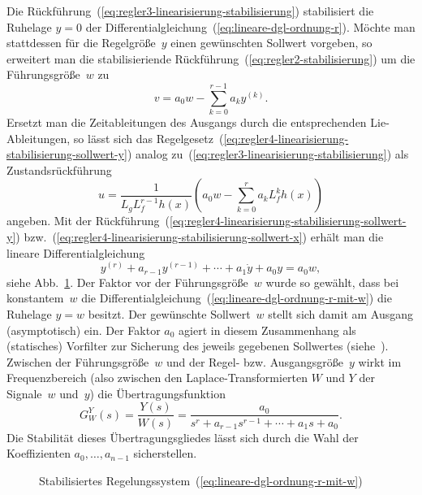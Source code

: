 Die Rückführung~(\ref{eq:regler3-linearisierung-stabilisierung})
stabilisiert die Ruhelage $y=0$ der Differentialgleichung~(\ref{eq:lineare-dgl-ordnung-r}).
Möchte man stattdessen für die Regelgröße~$y$ einen gewünschten
Sollwert vorgeben, so erweitert man die stabilisieriende Rückführung~(\ref{eq:regler2-stabilisierung})
um die Führungsgröße~$w$ zu 
\begin{equation}
v=a_{0}w-\sum_{k=0}^{r-1}a_{k}y^{(k)}.\label{eq:regler4-linearisierung-stabilisierung-sollwert-y}
\end{equation}
Ersetzt man die Zeitableitungen des Ausgangs durch die entsprechenden
Lie-Ableitungen, so lässt sich das Regelgesetz~(\ref{eq:regler4-linearisierung-stabilisierung-sollwert-y})
analog zu~(\ref{eq:regler3-linearisierung-stabilisierung}) als Zustandsrückführung
\begin{equation}
u=\frac{1}{L_{g}L_{f}^{r-1}h(x)}\left(a_{0}w-\sum_{k=0}^{r}a_{k}L_{f}^{k}h(x)\right)\label{eq:regler4-linearisierung-stabilisierung-sollwert-x}
\end{equation}
angeben. Mit der Rückführung~(\ref{eq:regler4-linearisierung-stabilisierung-sollwert-y})
bzw.~(\ref{eq:regler4-linearisierung-stabilisierung-sollwert-x})
erhält man die lineare Differentialgleichung 
\begin{equation}
y^{(r)}+a_{r-1}y^{(r-1)}+\cdots+a_{1}\dot{y}+a_{0}y=a_{0}w,\label{eq:lineare-dgl-ordnung-r-mit-w}
\end{equation}
siehe Abb.~\ref{fig:regelungsnormalform-lin-stab-w}. Der Faktor
vor der Führungsgröße~$w$ wurde so gewählt, dass bei konstantem~$w$
die Differentialgleichung~(\ref{eq:lineare-dgl-ordnung-r-mit-w})
die Ruhelage $y=w$ besitzt. Der gewünschte Sollwert~$w$ stellt
sich damit am Ausgang (asymptotisch) ein. Der Faktor $a_{0}$ agiert
in diesem Zusammenhang als (statisches) Vorfilter zur Sicherung des
jeweils gegebenen Sollwertes (siehe~\cite[Abschnitt~{4.4.2}]{lunze-rt2}).
Zwischen der Führungsgröße~$w$ und der Regel- bzw. Ausgangs\-größe~$y$
wirkt im Frequenzbereich (also zwischen den Laplace-Transformierten
$W$ und $Y$ der Signale~$w$ und~$y$) die Übertragungsfunktion
\begin{equation}
G_{W}^{Y}(s)=\frac{Y(s)}{W(s)}=\frac{a_{0}}{s^{r}+a_{r-1}s^{r-1}+\cdots+a_{1}s+a_{0}}.\label{eq:UF-WY}
\end{equation}
Die Stabilität dieses Übertragungsgliedes lässt sich durch die Wahl
der Koeffizienten $a_{0},\ldots,a_{n-1}$ sicherstellen. 

\begin{figure}
\begin{centering}
\resizebox{0.85\textwidth}{!}{}
\par\end{centering}
\caption{Stabilisiertes Regelungssystem~(\ref{eq:lineare-dgl-ordnung-r-mit-w})\label{fig:regelungsnormalform-lin-stab-w}}
\end{figure}

